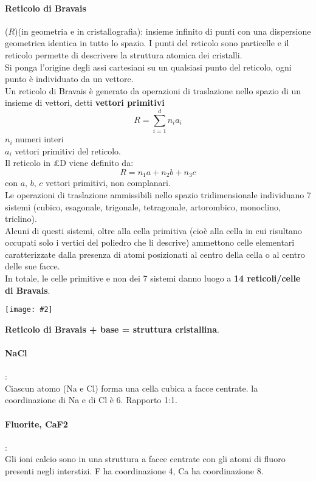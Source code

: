 \documentclass{article}
\newcommand{\img}[2]
{
\begin{center}
    \texttt{[image: \#2]}
\end{center}
}
\begin{document}
\paragraph{Reticolo di Bravais}($R$)(in geometria e in cristallografia): insieme infinito di punti con una dispersione geometrica identica in tutto lo spazio. I punti del reticolo sono particelle e il reticolo permette di descrivere la struttura atomica dei cristalli.\\
Si ponga l'origine degli assi cartesiani su un qualsiasi punto del reticolo, ogni punto è individuato da un vettore. \\
Un reticolo di Bravais è generato da operazioni di traslazione nello spazio di un insieme di vettori, detti \textbf{vettori primitivi}
\begin{equation*}
    R=\sum_{i=1}^{d}n_ia_i
\end{equation*}
$n_i$ numeri interi\\$a_i$ vettori primitivi del reticolo.
\\
Il reticolo in £D viene definito da:
\begin{equation*}
    R=n_1a+n_2b+n_3c
\end{equation*}
con $a, \,b,\,c$ vettori primitivi, non complanari.\\
Le operazioni di traslazione ammissibili nello spazio tridimensionale individuano 7 sistemi (cubico, esagonale, trigonale, tetragonale, artorombico, monoclino, triclino).\\
Alcuni di questi sistemi, oltre alla cella primitiva (cioè alla cella in cui risultano occupati solo i vertici del poliedro che li descrive) ammettono celle elementari caratterizzate dalla presenza di atomi posizionati al centro della cella o al centro delle sue facce. \\
In totale, le celle primitive e non dei 7 sistemi danno luogo a \textbf{14 reticoli/celle di Bravais}.

\img{13}{bravais.png}

\textbf{Reticolo di Bravais + base = struttura cristallina}.
\paragraph{NaCl}:
\\Ciascun atomo (Na e Cl) forma una cella cubica a facce centrate. la coordinazione di Na e di Cl è 6. Rapporto 1:1.
\paragraph{Fluorite, CaF2}:\\
Gli ioni calcio sono in una struttura a facce centrate con gli atomi di fluoro presenti negli interstizi. F ha coordinazione 4, Ca ha coordinazione 8.
\end{document}
